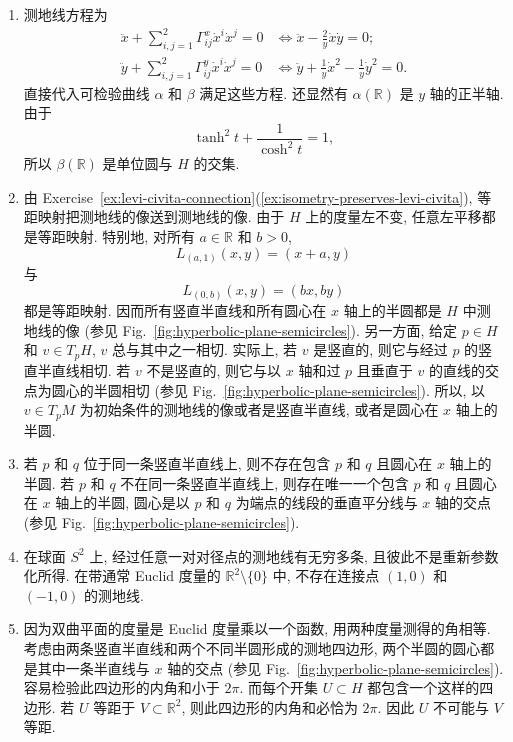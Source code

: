 \begin{description}[font=\normalfont,leftmargin=2em,labelwidth=1.5em]
\begin{enumerate}[label=(\alph*),ref=\alph*,leftmargin=*]
\begin{align*}
  &=\frac12g^{xx}\left(0+\frac{\partial}{\partial y}\left(\frac{1}{y^2}\right)-0\right)
  =-\frac1y.
\end{align*}
八个 Christoffel 符号中只有四个非零: 上面算出的一个及
\[
  \Gamma^x_{yx}=-\Gamma^y_{xx}=\Gamma^y_{yy}=-\frac1y.
\]
\item 测地线方程为
\begin{align*}
  \ddot x+\sum_{i,j=1}^2\Gamma^x_{ij}\dot{x}^i\dot{x}^j=0
  &\iff\ddot x-\frac2y\dot x\dot y=0;\\
  \ddot y+\sum_{i,j=1}^2\Gamma^y_{ij}\dot{x}^i\dot{x}^j=0
  &\iff\ddot y+\frac1y\dot x^2-\frac1y\dot y^2=0.
\end{align*}
直接代入可检验曲线 $\alpha$ 和 $\beta$ 满足这些方程. 还显然有 $\alpha(\mathbb{R})$ 是 $y$ 轴的正半轴. 由于
\[
  \tanh^2t+\frac1{\cosh^2t}=1,
\]
所以 $\beta(\mathbb{R})$ 是单位圆与 $H$ 的交集.
\item 由 Exercise~\ref{ex:levi-civita-connection}(\ref{ex:isometry-preserves-levi-civita}), 等距映射把测地线的像送到测地线的像. 由于 $H$ 上的度量左不变, 任意左平移都是等距映射. 特别地, 对所有 $a\in\mathbb{R}$ 和 $b>0$,
\[
  L_{(a,1)}(x,y)=(x+a,y)
\]
与
\[
  L_{(0,b)}(x,y)=(bx,by)
\]
都是等距映射. 因而所有竖直半直线和所有圆心在 $x$ 轴上的半圆都是 $H$ 中测地线的像 (参见 Fig.~\ref{fig:hyperbolic-plane-semicircles}). 另一方面, 给定 $p\in H$ 和 $v\in T_pH$, $v$ 总与其中之一相切. 实际上, 若 $v$ 是竖直的, 则它与经过 $p$ 的竖直半直线相切. 若 $v$ 不是竖直的, 则它与以 $x$ 轴和过 $p$ 且垂直于 $v$ 的直线的交点为圆心的半圆相切 (参见 Fig.~\ref{fig:hyperbolic-plane-semicircles}). 所以, 以 $v\in T_pM$ 为初始条件的测地线的像或者是竖直半直线, 或者是圆心在 $x$ 轴上的半圆.
\item 若 $p$ 和 $q$ 位于同一条竖直半直线上, 则不存在包含 $p$ 和 $q$ 且圆心在 $x$ 轴上的半圆. 若 $p$ 和 $q$ 不在同一条竖直半直线上, 则存在唯一一个包含 $p$ 和 $q$ 且圆心在 $x$ 轴上的半圆, 圆心是以 $p$ 和 $q$ 为端点的线段的垂直平分线与 $x$ 轴的交点 (参见 Fig.~\ref{fig:hyperbolic-plane-semicircles}).
\item 在球面 $S^2$ 上, 经过任意一对对径点的测地线有无穷多条, 且彼此不是重新参数化所得. 在带通常 Euclid 度量的 $\mathbb{R}^2\setminus\{0\}$ 中, 不存在连接点 $(1,0)$ 和 $(-1,0)$ 的测地线.
\item 因为双曲平面的度量是 Euclid 度量乘以一个函数, 用两种度量测得的角相等. 考虑由两条竖直半直线和两个不同半圆形成的测地四边形, 两个半圆的圆心都是其中一条半直线与 $x$ 轴的交点 (参见 Fig.~\ref{fig:hyperbolic-plane-semicircles}). 容易检验此四边形的内角和小于 $2\pi$. 而每个开集 $U\subset H$ 都包含一个这样的四边形. 若 $U$ 等距于 $V\subset\mathbb{R}^2$, 则此四边形的内角和必恰为 $2\pi$. 因此 $U$ 不可能与 $V$ 等距.

\end{enumerate}
\end{description}
